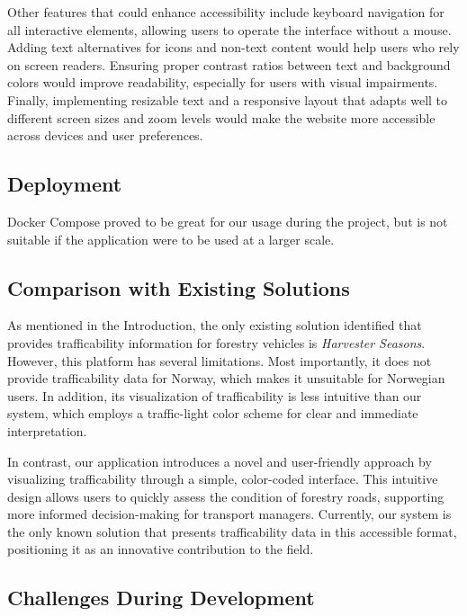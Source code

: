 Other features that could enhance accessibility include keyboard navigation for all interactive elements, allowing users to operate the interface without a mouse. Adding text alternatives for icons and non-text content would help users who rely on screen readers. Ensuring proper contrast ratios between text and background colors would improve readability, especially for users with visual impairments. Finally, implementing resizable text and a responsive layout that adapts well to different screen sizes and zoom levels would make the website more accessible across devices and user preferences.

\subsection{Deployment}%

Docker Compose proved to be great for our usage during the project, but is not suitable if the application were to be used at a larger scale.

\subsection{Comparison with Existing Solutions}

As mentioned in the Introduction, the only existing solution identified that provides trafficability information for forestry vehicles is \textit{Harvester Seasons}. However, this platform has several limitations. Most importantly, it does not provide trafficability data for Norway, which makes it unsuitable for Norwegian users. In addition, its visualization of trafficability is less intuitive than our system, which employs a traffic-light color scheme for clear and immediate interpretation.

In contrast, our application introduces a novel and user-friendly approach by visualizing trafficability through a simple, color-coded interface. This intuitive design allows users to quickly assess the condition of forestry roads, supporting more informed decision-making for transport managers. Currently, our system is the only known solution that presents trafficability data in this accessible format, positioning it as an innovative contribution to the field.

\subsection{Challenges During Development}

